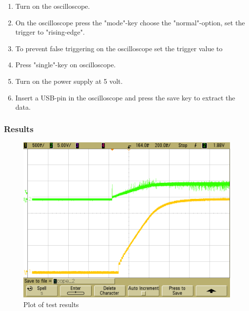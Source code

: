 \begin{enumerate}
  \item Turn on the oscilloscope.
  \item On the oscilloscope press the "mode"-key choose the "normal"-option, set the trigger to "rising-edge".
  \item To prevent false triggering on the oscilloscope set the trigger value to %
  \item Press "single"-key on oscilloscope.
  \item Turn on the power supply at 5 volt.
  \item Insert a USB-pin in the oscilloscope and press the save key to extract the data.
\end{enumerate}

\subsubsection{Results}
\begin{figure}[H]
	\centering
	\includegraphics[scale=.4]{figures/Exercise8}
	\caption{Plot of test results}
\end{figure}
